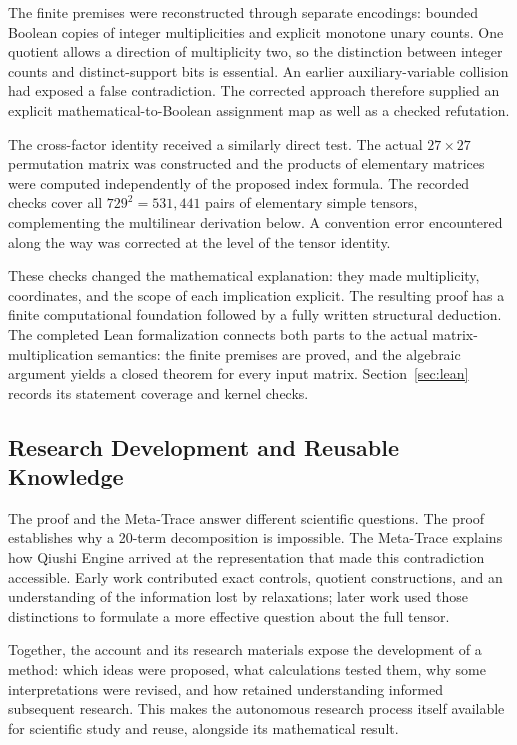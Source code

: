 The finite premises were reconstructed through separate encodings:
bounded Boolean copies of integer multiplicities and explicit monotone
unary counts. One quotient allows a direction of multiplicity two, so
the distinction between integer counts and distinct-support bits is
essential. An earlier auxiliary-variable collision had exposed a false
contradiction. The corrected approach therefore supplied an explicit
mathematical-to-Boolean assignment map as well as a checked refutation.

The cross-factor identity received a similarly direct test. The actual
$27\times27$ permutation matrix was constructed and the products of
elementary matrices were computed independently of the proposed index
formula. The recorded checks cover all $729^2=531{,}441$ pairs of
elementary simple tensors, complementing the multilinear derivation
below. A convention error encountered along the way was corrected at
the level of the tensor identity.

These checks changed the mathematical explanation: they made multiplicity,
coordinates, and the scope of each implication explicit. The resulting
proof has a finite computational foundation followed by a fully written
structural deduction. The completed Lean formalization connects both
parts to the actual matrix-multiplication semantics: the finite premises
are proved, and the algebraic argument yields a closed theorem for every
input matrix. Section~\ref{sec:lean} records its statement coverage and
kernel checks.

\subsection{Research Development and Reusable Knowledge}

The proof and the Meta-Trace answer different scientific questions.
The proof establishes why a 20-term decomposition is impossible.
The Meta-Trace explains how Qiushi Engine arrived at the representation
that made this contradiction accessible. Early work contributed exact
controls, quotient constructions, and an understanding of the information
lost by relaxations; later work used those distinctions to formulate a
more effective question about the full tensor.

Together, the account and its research materials expose the development
of a method: which ideas were proposed, what calculations tested them,
why some interpretations were revised, and how retained understanding
informed subsequent research. This makes the autonomous research
process itself available for scientific study and reuse, alongside its
mathematical result.

